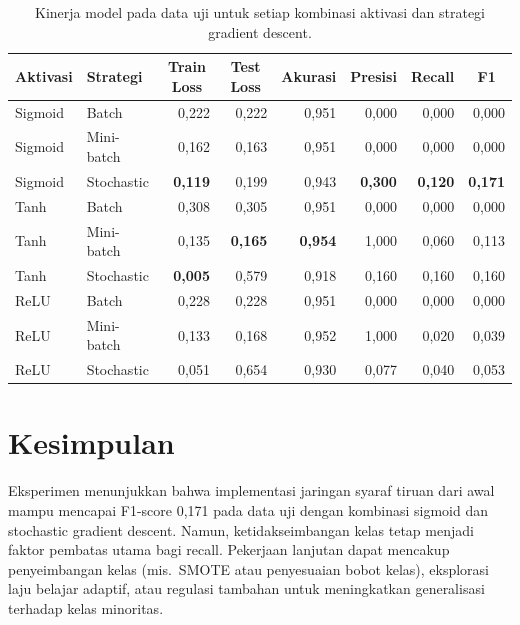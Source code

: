 \documentclass[12pt]{article}
\begin{document}
\begin{table}[htbp]
    \centering
    \caption{Kinerja model pada data uji untuk setiap kombinasi aktivasi dan strategi gradient descent.}
    \label{tab:metrics}
    \small
    \begin{tabular}{llrrrrrr}
        \toprule
        Aktivasi & Strategi & \multicolumn{1}{c}{Train Loss} & \multicolumn{1}{c}{Test Loss} & \multicolumn{1}{c}{Akurasi} & \multicolumn{1}{c}{Presisi} & \multicolumn{1}{c}{Recall} & \multicolumn{1}{c}{F1} \\
        \midrule
        Sigmoid & Batch & 0{,}222 & 0{,}222 & 0{,}951 & 0{,}000 & 0{,}000 & 0{,}000 \\
        Sigmoid & Mini-batch & 0{,}162 & 0{,}163 & 0{,}951 & 0{,}000 & 0{,}000 & 0{,}000 \\
        Sigmoid & Stochastic & \textbf{0{,}119} & 0{,}199 & 0{,}943 & \textbf{0{,}300} & \textbf{0{,}120} & \textbf{0{,}171} \\
        Tanh & Batch & 0{,}308 & 0{,}305 & 0{,}951 & 0{,}000 & 0{,}000 & 0{,}000 \\
        Tanh & Mini-batch & 0{,}135 & \textbf{0{,}165} & \textbf{0{,}954} & 1{,}000 & 0{,}060 & 0{,}113 \\
        Tanh & Stochastic & \textbf{0{,}005} & 0{,}579 & 0{,}918 & 0{,}160 & 0{,}160 & 0{,}160 \\
        ReLU & Batch & 0{,}228 & 0{,}228 & 0{,}951 & 0{,}000 & 0{,}000 & 0{,}000 \\
        ReLU & Mini-batch & 0{,}133 & 0{,}168 & 0{,}952 & 1{,}000 & 0{,}020 & 0{,}039 \\
        ReLU & Stochastic & 0{,}051 & 0{,}654 & 0{,}930 & 0{,}077 & 0{,}040 & 0{,}053 \\
        \bottomrule
    \end{tabular}
\end{table}

 
\section*{Kesimpulan}
Eksperimen menunjukkan bahwa implementasi jaringan syaraf tiruan dari awal mampu mencapai F1-score 0,171 pada data uji dengan kombinasi sigmoid dan stochastic gradient descent. Namun, ketidakseimbangan kelas tetap menjadi faktor pembatas utama bagi recall. Pekerjaan lanjutan dapat mencakup penyeimbangan kelas (mis.~SMOTE atau penyesuaian bobot kelas), eksplorasi laju belajar adaptif, atau regulasi tambahan untuk meningkatkan generalisasi terhadap kelas minoritas.
\end{document}

